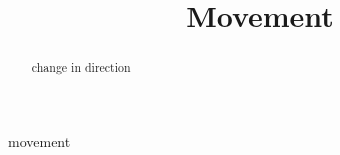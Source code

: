 \documentclass{ximera}
\title{Movement}
\begin{document}
\begin{abstract}
change in direction
\end{abstract}
\maketitle




movement
\end{document}
